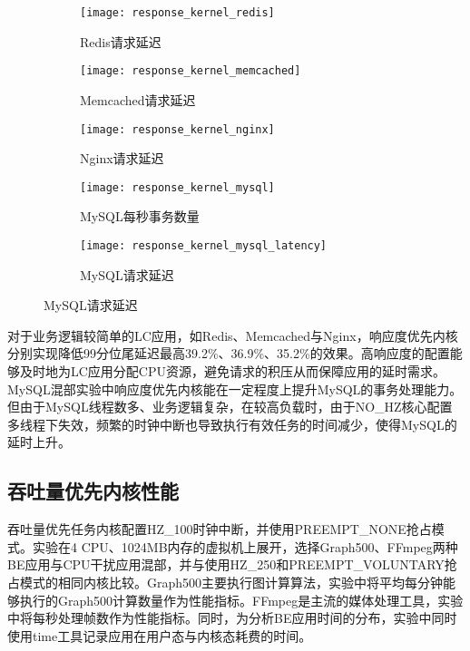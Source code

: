 \begin{figure}[H]
    \centering
    \begin{subfigure}[b]{0.32\textwidth}
      \texttt{[image: response\_kernel\_redis]}
      \caption{Redis请求延迟}
      \label{fig:response_kernel_redis}
    \end{subfigure}
    \begin{subfigure}[b]{0.32\textwidth}
      \texttt{[image: response\_kernel\_memcached]}
      \caption{Memcached请求延迟}
      \label{fig:response_kernel_memcached}
    \end{subfigure}
    \begin{subfigure}[b]{0.32\textwidth}
        \texttt{[image: response\_kernel\_nginx]}
        \caption{Nginx请求延迟}
        \label{fig:response_kernel_nginx}
      \end{subfigure}
      \begin{subfigure}[b]{0.32\textwidth}
        \texttt{[image: response\_kernel\_mysql]}
        \caption{\quad MySQL每秒事务数量}
        \label{fig:response_kernel_mysql_tpmc}
      \end{subfigure}
      \begin{subfigure}[b]{0.32\textwidth}
        \texttt{[image: response\_kernel\_mysql\_latency]}
        \caption{MySQL请求延迟}
        \label{fig:response_kernel_mysql}
      \end{subfigure}
    \label{fig:perf_response}
\end{figure}

对于业务逻辑较简单的LC应用，如Redis、Memcached与Nginx，响应度优先内核分别实现降低99分位尾延迟最高39.2\%、36.9\%、35.2\%的效果。高响应度的配置能够及时地为LC应用分配CPU资源，避免请求的积压从而保障应用的延时需求。MySQL混部实验中响应度优先内核能在一定程度上提升MySQL的事务处理能力。但由于MySQL线程数多、业务逻辑复杂，在较高负载时，由于NO\_HZ核心配置多线程下失效，频繁的时钟中断也导致执行有效任务的时间减少，使得MySQL的延时上升。

\subsection{吞吐量优先内核性能}


吞吐量优先任务内核配置HZ\_100时钟中断，并使用PREEMPT\_NONE抢占模式。实验在4 CPU、1024MB内存的虚拟机上展开，选择Graph500、FFmpeg两种BE应用与CPU干扰应用混部，并与使用HZ\_250和PREEMPT\_VOLUNTARY抢占模式的相同内核比较。Graph500主要执行图计算算法，实验中将平均每分钟能够执行的Graph500计算数量作为性能指标。FFmpeg是主流的媒体处理工具，实验中将每秒处理帧数作为性能指标。同时，为分析BE应用时间的分布，实验中同时使用time工具记录应用在用户态与内核态耗费的时间。

